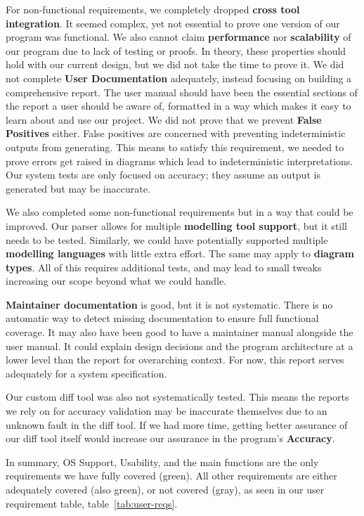 For non-functional requirements, we completely dropped \textbf{cross tool integration}.
It seemed complex, yet not essential to prove one version of our program was functional.
We also cannot claim \textbf{performance} nor \textbf{scalability} of our program due to lack of testing or proofs.
In theory, these properties should hold with our current design, but we did not take the time to prove it.
We did not complete \textbf{User Documentation} adequately, instead focusing on building a comprehensive report.
The user manual should have been the essential sections of the report a user should be aware of,
formatted in a way which makes it easy to learn about and use our project.
We did not prove that we prevent \textbf{False Positives} either.
False positives are concerned with preventing indeterministic outputs from generating.
This means to satisfy this requirement,
we needed to prove errors get raised in diagrams which lead to indeterministic interpretations.
Our system tests are only focused on accuracy; they assume an output is generated but may be inaccurate.

We also completed some non-functional requirements but in a way that could be improved.
Our parser allows for multiple \textbf{modelling tool support}, but it still needs to be tested.
Similarly, we could have potentially supported multiple \textbf{modelling languages} with little extra effort.
The same may apply to \textbf{diagram types}.
All of this requires additional tests, and may lead to small tweaks increasing our scope beyond what we could handle.

\textbf{Maintainer documentation} is good, but it is not systematic.
There is no automatic way to detect missing documentation to ensure full functional coverage.
It may also have been good to have a maintainer manual alongside the user manual.
It could explain design decisions and the program architecture at a lower level than the report for overarching context.
For now, this report serves adequately for a system specification.

Our custom diff tool was also not systematically tested.
This means the reports we rely on for accuracy validation may be inaccurate themselves due to an unknown fault in the diff tool.
If we had more time, getting better assurance of our diff tool itself would increase our assurance in the program's
\textbf{Accuracy}.

In summary, OS Support, Usability, and the main functions are the only requirements we have fully covered (green).
All other requirements are either adequately covered (also green), or not covered (gray),
as seen in our user requirement table, table~\ref{tab:user-reqs}.


